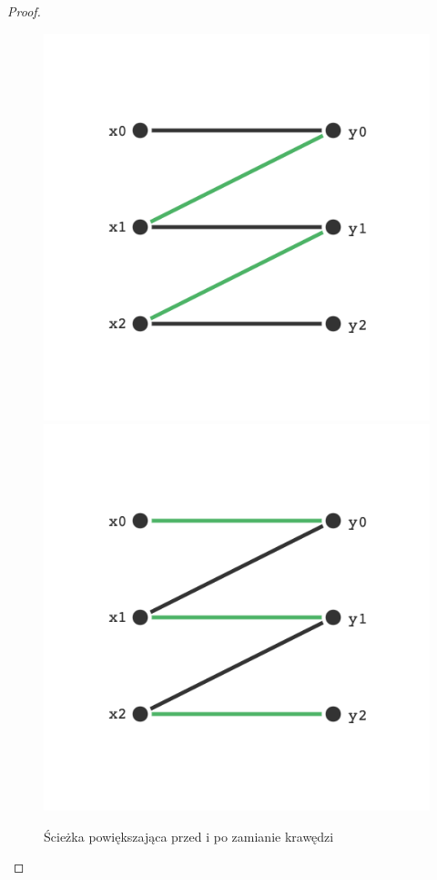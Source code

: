 \begin{proof}
	\begin{figure}[H]
		\centering
		\includegraphics[scale=0.3]{images/hall/augmenting_path_before.png}
		\includegraphics[scale=0.3]{images/hall/augmenting_path_after.png}
		\caption{Ścieżka powiększająca przed i po zamianie krawędzi}
	\end{figure}
	\pagebreak


\end{proof}
